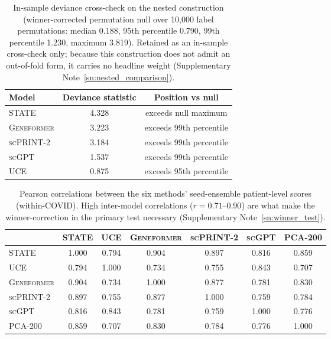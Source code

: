\documentclass[11pt,a4paper]{article}
\newcommand{\model}[1]{\textsc{#1}}
\begin{document}
\begin{table}[t]
\centering
\caption{In-sample deviance cross-check on the nested construction
(winner-corrected permutation null over 10{,}000 label permutations: median
0.188, 95th percentile 0.790, 99th percentile 1.230, maximum 3.819).
Retained as an in-sample cross-check only; because this construction does
not admit an out-of-fold form, it carries no headline weight
(Supplementary Note~\ref{sn:nested_comparison}).}
\label{tab:nested_deviance}
\small
\begin{tabular}{lcc}
\toprule
\textbf{Model} & \textbf{Deviance statistic} & \textbf{Position vs null} \\
\midrule
\model{STATE} & 4.328 & exceeds null maximum \\
\model{Geneformer} & 3.223 & exceeds 99th percentile \\
\model{scPRINT-2} & 3.184 & exceeds 99th percentile \\
\model{scGPT} & 1.537 & exceeds 99th percentile \\
\model{UCE} & 0.875 & exceeds 95th percentile \\
\bottomrule
\end{tabular}
\end{table}

\begin{table}[t]
\centering
\caption{Pearson correlations between the six methods' seed-ensemble
patient-level scores (within-COVID). High inter-model correlations
($r = 0.71$--$0.90$) are what make the winner-correction in the primary
test necessary (Supplementary Note~\ref{sn:winner_test}).}
\label{tab:score_correlation}
\small
\begin{tabular}{lcccccc}
\toprule
 & \textbf{\model{STATE}} & \textbf{\model{UCE}} & \textbf{\model{Geneformer}} & \textbf{\model{scPRINT-2}} & \textbf{\model{scGPT}} & \textbf{PCA-200} \\
\midrule
\model{STATE} & 1.000 & 0.794 & 0.904 & 0.897 & 0.816 & 0.859 \\
\model{UCE} & 0.794 & 1.000 & 0.734 & 0.755 & 0.843 & 0.707 \\
\model{Geneformer} & 0.904 & 0.734 & 1.000 & 0.877 & 0.781 & 0.830 \\
\model{scPRINT-2} & 0.897 & 0.755 & 0.877 & 1.000 & 0.759 & 0.784 \\
\model{scGPT} & 0.816 & 0.843 & 0.781 & 0.759 & 1.000 & 0.776 \\
PCA-200 & 0.859 & 0.707 & 0.830 & 0.784 & 0.776 & 1.000 \\
\bottomrule
\end{tabular}
\end{table}
\end{document}
